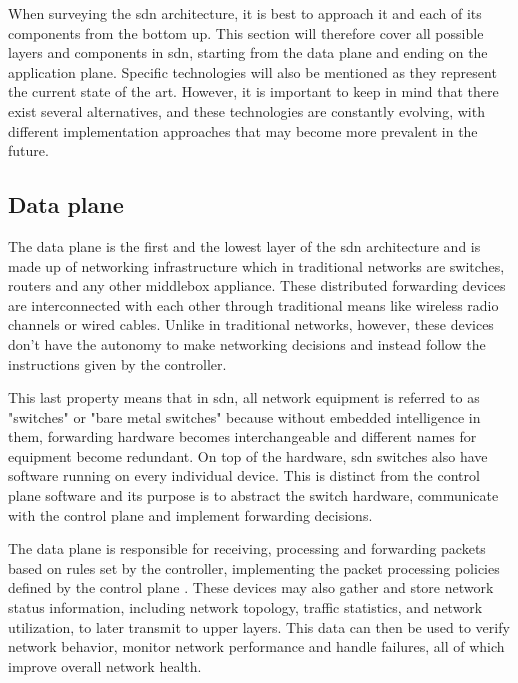When surveying the \gls{sdn} architecture, it is best to approach it and each of its components from the bottom up. This section will therefore cover all possible layers and components in \gls{sdn}, starting from the data plane and ending on the application plane. Specific technologies will also be mentioned as they represent the current state of the art. However, it is important to keep in mind that there exist several alternatives, and these technologies are constantly evolving, with different implementation approaches that may become more prevalent in the future. 



\subsection{Data plane} %

The data plane is the first and the lowest layer of the \gls{sdn} architecture and is made up of networking infrastructure which in traditional networks are switches, routers and any other middlebox appliance. These distributed forwarding devices are interconnected with each other through traditional means like wireless radio channels or wired cables. Unlike in traditional networks, however, these devices don't have the autonomy to make networking decisions and instead follow the instructions given by the controller\cite{kreutz_software-defined_2015}. 

This last property means that in \gls{sdn}, all network equipment is referred to as "switches" or "bare metal switches"\cite{peterson_software-defined_2021} because without embedded intelligence in them, forwarding hardware becomes interchangeable and different names for equipment become redundant. On top of the hardware, \gls{sdn} switches also have software running on every individual device. This is distinct from the control plane software and its purpose is to abstract the switch hardware, communicate with the control plane and implement forwarding decisions. 

The data plane is responsible for receiving, processing and forwarding packets based on rules set by the controller, implementing the packet processing policies defined by the control plane\cite{mckeown_openflow_2008}  \cite{xia_survey_2015}. These devices may also gather and store network status information, including network topology, traffic statistics, and network utilization, to later transmit to upper layers\cite{xia_survey_2015}. This data can then be used to verify network behavior, monitor network performance and handle failures, all of which improve overall network health\cite{bifulco_survey_2018}.


